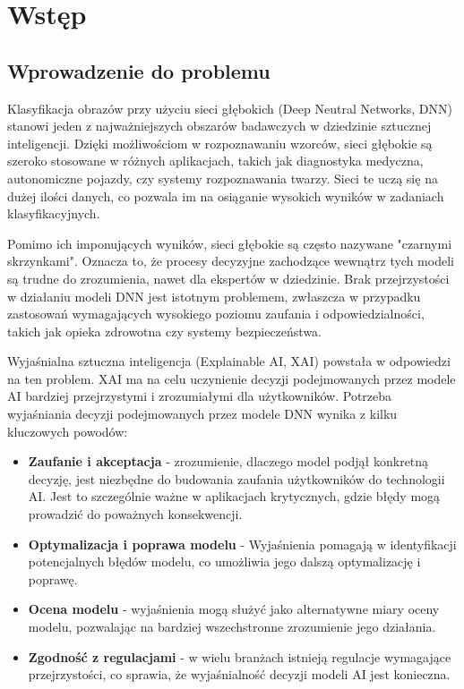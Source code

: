 
\chapter*{Wstęp}

\section*{Wprowadzenie do problemu}
Klasyfikacja obrazów przy użyciu sieci głębokich (Deep Neutral Networks, DNN) stanowi jeden z najważniejszych obszarów badawczych w dziedzinie sztucznej inteligencji.
Dzięki możliwościom w rozpoznawaniu wzorców, sieci głębokie są szeroko stosowane w różnych aplikacjach, takich jak diagnostyka medyczna, autonomiczne pojazdy, czy systemy rozpoznawania twarzy.
Sieci te uczą się na dużej ilości danych, co pozwala im na osiąganie wysokich wyników w zadaniach klasyfikacyjnych.

Pomimo ich imponujących wyników, sieci głębokie są często nazywane "czarnymi skrzynkami".
Oznacza to, że procesy decyzyjne zachodzące wewnątrz tych modeli są trudne do zrozumienia, nawet dla ekspertów w dziedzinie.
Brak przejrzystości w działaniu modeli DNN jest istotnym problemem, zwłaszcza w przypadku zastosowań wymagających wysokiego poziomu zaufania i odpowiedzialności, takich jak opieka zdrowotna czy systemy bezpieczeństwa.

Wyjaśnialna sztuczna inteligencja (Explainable AI, XAI) powstała w odpowiedzi na ten problem.
XAI ma na celu uczynienie decyzji podejmowanych przez modele AI bardziej przejrzystymi i zrozumiałymi dla użytkowników.
Potrzeba wyjaśniania decyzji podejmowanych przez modele DNN wynika z kilku kluczowych powodów:
\begin{itemize}
	\item \textbf{Zaufanie i akceptacja} - zrozumienie, dlaczego model podjął konkretną decyzję, jest niezbędne do budowania zaufania użytkowników do technologii AI.
	      Jest to szczególnie ważne w aplikacjach krytycznych, gdzie błędy mogą prowadzić do poważnych konsekwencji.
	\item \textbf{Optymalizacja i poprawa modelu} - Wyjaśnienia pomagają w identyfikacji potencjalnych błędów modelu, co umożliwia jego dalszą optymalizację i poprawę.
	\item \textbf{Ocena modelu} - wyjaśnienia mogą służyć jako alternatywne miary oceny modelu, pozwalając na bardziej wszechstronne zrozumienie jego działania.
	\item \textbf{Zgodność z regulacjami} - w wielu branżach istnieją regulacje wymagające przejrzystości, co sprawia, że wyjaśnialność decyzji modeli AI jest konieczna.
\end{itemize}

